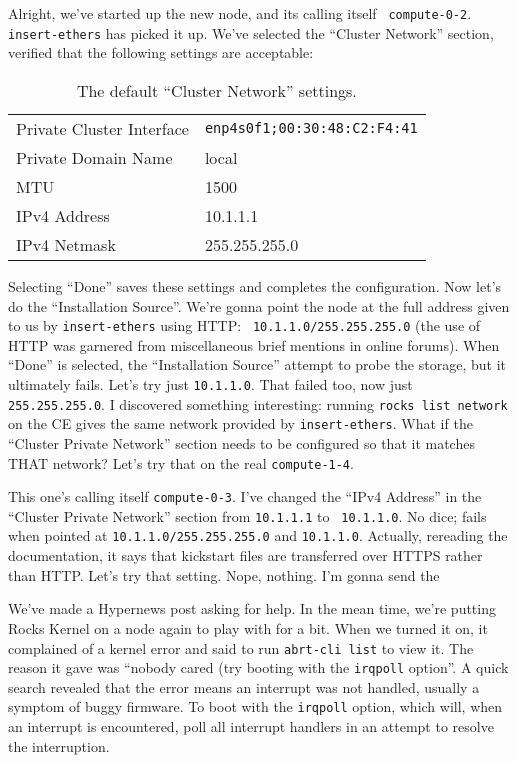\documentclass[12pt]{article}
\begin{document}
\qq Alright, we've started up the new node, and its calling itself {\tt
  compute-0-2}. {\tt insert-ethers} has picked it up. We've selected the
``Cluster Network'' section, verified that the following settings are
acceptable:

\begin{table}[H]
  \caption{The default ``Cluster Network'' settings.}
  \begin{center}
    \begin{tabular}{|l|l|}
      \hline
      Private Cluster Interface & {\tt enp4s0f1;00:30:48:C2:F4:41} \\
      Private Domain Name & local \\
      MTU & 1500 \\
      IPv4 Address & 10.1.1.1 \\
      IPv4 Netmask & 255.255.255.0 \\
      \hline
    \end{tabular}
  \end{center}
\end{table}

Selecting ``Done'' saves these settings and completes the configuration. Now
let's do the ``Installation Source''. We're gonna point the node at the full
address given to us by {\tt insert-ethers} using HTTP: {\tt
  10.1.1.0/255.255.255.0} (the use of HTTP was garnered from miscellaneous
brief mentions in online forums). When ``Done'' is selected, the ``Installation
Source'' attempt to probe the storage, but it ultimately fails. Let's try just
{\tt 10.1.1.0}. That failed too, now just {\tt 255.255.255.0}. I discovered
something interesting: running {\tt rocks list network} on the CE gives the same
network provided by {\tt insert-ethers}. What if the ``Cluster Private Network''
section needs to be configured so that it matches THAT network? Let's try that
on the real {\tt compute-1-4}.

\qq This one's calling itself {\tt compute-0-3}. I've changed the ``IPv4
Address'' in the ``Cluster Private Network'' section from {\tt 10.1.1.1} to {\tt
  10.1.1.0}. No dice; fails when pointed at {\tt 10.1.1.0/255.255.255.0} and
{\tt 10.1.1.0}. Actually, rereading the documentation, it says that kickstart
files are transferred over HTTPS rather than HTTP. Let's try that setting. Nope,
nothing. I'm gonna send the 

\qq We've made a Hypernews post asking for help. In the mean time, we're putting
Rocks Kernel on a node again to play with for a bit. When we turned it on, it
complained of a kernel error and said to run {\tt abrt-cli list} to view it. The
reason it gave was ``nobody cared (try booting with the {\tt irqpoll}
option''. A quick search revealed that the error means an interrupt was not
handled, usually a symptom of buggy firmware. To boot with the {\tt irqpoll}
option, which will, when an interrupt is encountered, poll all interrupt
handlers in an attempt to resolve the interruption. 
\end{document}
